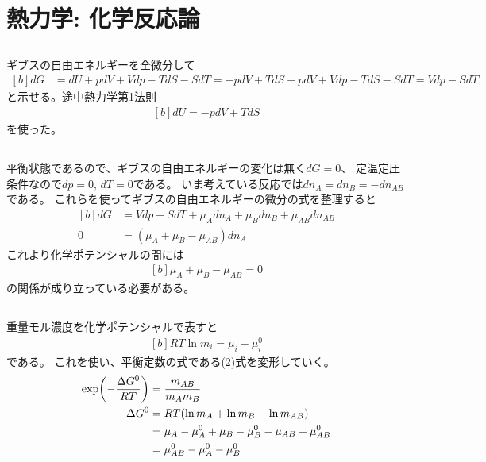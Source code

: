 \documentclass[../../master.tex]{subfiles}
\begin{document}
\section{熱力学: 化学反応論}
\subsection{}
ギブスの自由エネルギーを全微分して
\begin{equation}\begin{aligned}[b]
    dG &= dU + pdV + Vdp - TdS - SdT
    = -pdV + TdS + pdV + Vdp - TdS - SdT
    = Vdp - SdT
\end{aligned}\end{equation}
と示せる。途中熱力学第1法則
\begin{equation}\begin{aligned}[b]
    dU = -pdV +TdS
\end{aligned}\end{equation}
を使った。
\subsection{}
平衡状態であるので、ギブスの自由エネルギーの変化は無く\(dG = 0\)、
定温定圧条件なので\(dp=0,\,dT=0\)である。
いま考えている反応では\(dn_A = dn_B = -dn_{AB}\)である。
これらを使ってギブスの自由エネルギーの微分の式を整理すると
\begin{equation}\begin{aligned}[b]
    dG &= Vdp - SdT +\mu_A dn_A +\mu_Bdn_B +\mu_{AB}dn_{AB}\\
    0 &= (\mu_A+\mu_B-\mu_{AB})dn_A
\end{aligned}\end{equation}
これより化学ポテンシャルの間には
\begin{equation}\begin{aligned}[b]
    \mu_A+\mu_B-\mu_{AB}=0
\end{aligned}\end{equation}
の関係が成り立っている必要がある。

\subsection{}
重量モル濃度を化学ポテンシャルで表すと
\begin{equation}\begin{aligned}[b]
    RT\ln m_i = \mu_i - \mu_i^0
\end{aligned}\end{equation}
である。
これを使い、平衡定数の式である(2)式を変形していく。
\begin{equation}\begin{aligned}[b]
    \exp(-\frac{\Delta G^0}{RT}) &= \frac{m_{AB}}{m_Am_B}\\
    \Delta G^0 &= RT\qty(\ln m_A + \ln m_B -\ln m_{AB})\\
    &= \mu_A -\mu_A^0 +\mu_B - \mu_B^0 -\mu_{AB} + \mu_{AB}^0\\
    &= \mu_{AB}^0 -\mu_A^0 -\mu_B^0
\end{aligned}\end{equation}
\end{document}
